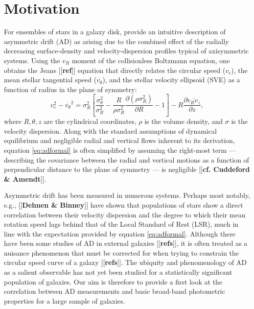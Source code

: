 \documentclass[apj,iop,revtex4,numberedappendix]{emulateapj}
\newcommand{\comment}[2][todo]{{\color{#1}[[{\bf #2}]]}}
\begin{document}

\section{ Motivation }
\label{sec:intro}

For ensembles of stars in a galaxy disk, \citet[][Section
4.4.3]{2008gady.book.....B} provide an intuitive description of
asymmetric drift (AD) as arising due to the combined effect of the
radially decreasing surface-density and velocity-dispersion profiles
typical of axisymmetric systems.  Using the $v_R$ moment of the
collisionless Boltzmann equation, one obtains the Jeans \comment{ref}
equation that directly relates the circular speed ($v_c$), the mean
stellar tangential speed ($\overline{v_\theta}$), and the stellar
velocity ellipsoid (SVE) as a function of radius in the plane of
symmetry:
%
\begin{equation}
%
v_c^2 - \overline{v_\theta}^2 = \sigma_R^2\left[
\frac{\sigma_\theta^2}{\sigma_R^2} -
\frac{R}{\rho\sigma_R^2}\frac{\partial(\rho\sigma_R^2)}{\partial R} -
1\right] - R\frac{\partial\overline{v_R v_z}}{\partial z},
%
\label{eq:adformal}
%
\end{equation}
%
where $R,\theta,z$ are the cylindrical coordinates, $\rho$ is the volume
density, and $\sigma$ is the velocity dispersion.  Along with the
standard assumptions of dynamical equilibrium and negligible radial and
vertical flows inherent to its derivation, equation \ref{eq:adformal} is
often simplified by assuming the right-most term --- describing the
covariance between the radial and vertical motions as a function of
perpendicular distance to the plane of symmetry --- is negligible
\comment{cf.  Cuddeford \& Amendt}.

Asymmetric drift has been measured in numerous systems.  Perhaps most
notably, e.g., \comment{Dehnen \& Binney} have shown that populations of
stars show a direct correlation between their velocity dispersion and
the degree to which their mean rotation speed lags behind that of the
Local Standard of Rest (LSR), much in line with the expectation provided
by equation \ref{eq:adformal}.  Although there have been some studies of
AD in external galaxies \comment{refs}, it is often treated as a
nuisance phenomenon that must be corrected for when trying to constrain
the circular speed curve of a galaxy \comment{refs}.  The ubiquity and
phenomenology of AD as a salient observable has not yet been studied for
a statistically significant population of galaxies.  Our aim is
therefore to provide a first look at the correlation between AD
measurements and basic broad-band photometric properties for a large
sample of galaxies.
\end{document}
